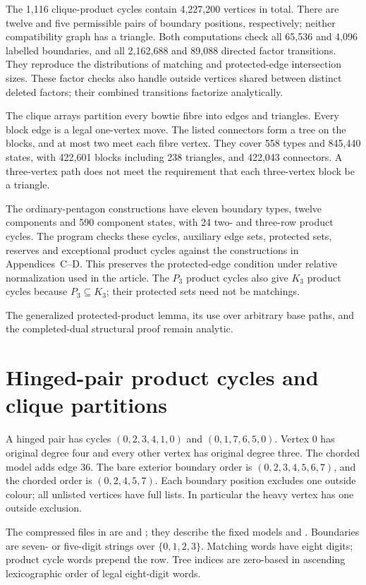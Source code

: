 The 1,116 clique-product cycles contain 4,227,200 vertices in total. There are twelve and five permissible pairs of boundary positions,
respectively; neither compatibility graph has a triangle. Both computations
check all 65,536 and 4,096 labelled boundaries, and all 2,162,688
and 89,088 directed factor transitions. They reproduce the distributions of matching and protected-edge
intersection sizes. These factor checks also handle
outside vertices shared between distinct deleted factors; their
combined transitions factorize analytically.

The clique arrays partition every bowtie fibre into edges and
triangles. Every block edge is a legal one-vertex move. The listed
connectors form a tree on the blocks, and at most two meet each
fibre vertex. They cover 558 types and 845,440 states,
with 422,601 blocks including 238 triangles, and 422,043 connectors.
A three-vertex path does not meet the requirement that each three-vertex block be a triangle.

The ordinary-pentagon constructions have eleven boundary types, twelve components
and 590 component states, with 24 two- and three-row product cycles.
The program checks these cycles, auxiliary edge sets, protected sets, reserves
and exceptional product cycles against the constructions in Appendices~C--D.
This preserves the protected-edge condition under relative normalization used in the
article. The $P_3$ product cycles also give $K_3$ product cycles because
$P_3\subseteq K_3$; their protected sets need not be matchings.

The generalized protected-product lemma, its use over arbitrary
base paths, and the completed-dual structural proof remain analytic.

\clearpage
\section{Hinged-pair product cycles and clique partitions}
\label{app:hinged-pair-constructions}
A hinged pair has cycles $(0,2,3,4,1,0)$ and $(0,1,7,6,5,0)$.
Vertex $0$ has original degree four and every other vertex has original
degree three. The chorded model adds edge $36$. The bare exterior boundary order is $(0,2,3,4,5,6,7)$, and the chorded order is $(0,2,4,5,7)$.
Each boundary position excludes one outside colour; all unlisted vertices have full
lists. In particular the heavy vertex has one outside exclusion.

The compressed files in  are
 and ; they describe the fixed
models  and . Boundaries are
seven- or five-digit strings over $\{0,1,2,3\}$. Matching words have
eight digits; product cycle words prepend the row. Tree indices are
zero-based in ascending lexicographic order of legal eight-digit words.

